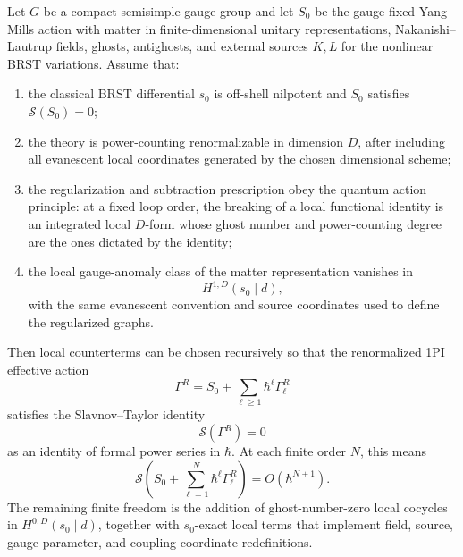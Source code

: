 \begin{theorem}
\label{thm:all-order-slavnov-taylor-restoration}
Let \(G\) be a compact semisimple gauge group and let \(S_0\) be the
gauge-fixed Yang--Mills action with matter in finite-dimensional unitary
representations, Nakanishi--Lautrup fields, ghosts, antighosts, and external
sources \(K,L\) for the nonlinear BRST variations.  Assume that:
\begin{enumerate}
\item the classical BRST differential \(s_0\) is off-shell nilpotent and
\(S_0\) satisfies \(\mathcal S(S_0)=0\);
\item the theory is power-counting renormalizable in dimension \(D\), after
including all evanescent local coordinates generated by the chosen dimensional
scheme;
\item the regularization and subtraction prescription obey the quantum action
principle: at a fixed loop order, the breaking of a local functional identity is
an integrated local \(D\)-form whose ghost number and power-counting degree are
the ones dictated by the identity;
\item the local gauge-anomaly class of the matter representation vanishes in
\[
  H^{1,D}(s_0\mid d),
\]
with the same evanescent convention and source coordinates used to define the
regularized graphs.
\end{enumerate}
Then local counterterms can be chosen recursively so that the renormalized 1PI
effective action
\[
  \Gamma^R
  =
  S_0+\sum_{\ell\ge 1}\hbar^\ell\Gamma^R_\ell
\]
satisfies the Slavnov--Taylor identity
\[
  \mathcal S(\Gamma^R)=0
\]
as an identity of formal power series in \(\hbar\).  At each finite order
\(N\), this means
\[
  \mathcal S\!\left(
  S_0+\sum_{\ell=1}^N \hbar^\ell\Gamma^R_\ell
  \right)
  =
  O(\hbar^{N+1}).
\]
The remaining finite freedom is the addition of ghost-number-zero local
cocycles in \(H^{0,D}(s_0\mid d)\), together with
\(s_0\)-exact local terms that implement field, source, gauge-parameter, and
coupling-coordinate redefinitions.
\end{theorem}

